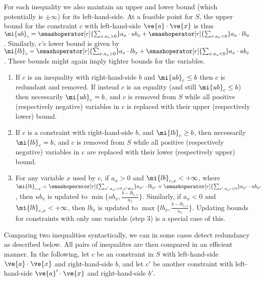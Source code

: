 For each inequality we also maintain an upper and lower bound (which potentially is $\pm \infty$) for its left-hand-side. At a feasible point for $S$, the upper bound for the constraint $c$ with left-hand-side $\ve{a}\cdot\ve{x}$ is thus $\mi{ub}_c = \smashoperator[r]{\sum_{x. a_x>0}}a_x\cdot ub_x + \smashoperator[r]{\sum_{x.a_x<0}}a_x\cdot lb_x$. Similarly, $c$'s lower bound is given by $\mi{lb}_c = \smashoperator[r]{\sum_{x.a_x>0}}a_x\cdot lb_x + \smashoperator[r]{\sum_{x.a_x<0}}a_x\cdot ub_x$.
These bounds might again imply tighter bounds for the variables. 
\begin{enumerate} \itemsep0em
\setcounter{enumi}{\value{counterName}}
	\item If $c$ is an inequality with right-hand-side $b$ and $\mi{ub}_c \leq b$ then $c$ is redundant and removed. If instead $c$ is an equality (and still $\mi{ub}_c \leq b$) then necessarily $\mi{ub}_c = b$, and $c$ is removed from $S$ while all positive (respectively negative) variables in $c$ is replaced with their upper (respectively lower) bound.
	\item If $c$ is a constraint with right-hand-side $b$, and $\mi{lb}_c \geq b$, then necessarily $\mi{lb}_c = b$, and $c$ is removed from $S$ while all positive (respectively negative) variables in $c$ are replaced with their lower (respectively upper) bound.
	\item For any variable $x$ used by $c$, if $a_x > 0$ and $\mi{lb}_{c,x}<+\infty$, 
	where $\mi{lb}_{c,x} = \smashoperator[r]{\sum_{x'.a_{x'}>0, x'\neq x}}a_{x'}\cdot lb_{x'} + \smashoperator[r]{\sum_{x'.a_{x'}<0}}a_{x'}\cdot ub_{x'}$, 
	then $ub_x$ is updated to $\min\{ub_x, \frac{b-\mathit{lb}_{c,x}}{a_x}\}$. 
	Similarly, if $a_x < 0$ and $\mi{lb}_{c,x}<+\infty$, then $lb_x$ is updated to $\max\{lb_x, \frac{b-\mathit{lb}_{c,x}}{a_x}\}$.	
	Updating bounds for constraints with only one variable (step 3) is a special case of this.
\setcounter{counterName}{\value{enumi}}
\end{enumerate}	
%
Comparing two inequalities syntactically, we can in some cases detect redundancy as described below. All pairs of inequalites are then compared in an efficient manner.
In the following, let $c$ be an constraint in $S$ with left-hand-side $\ve{a}\cdot \ve{x}$ and right-hand-side $b$, and let $c'$ be another constraint with left-hand-side $\ve{a}'\cdot \ve{x}$ and right-hand-side $b'$. 

